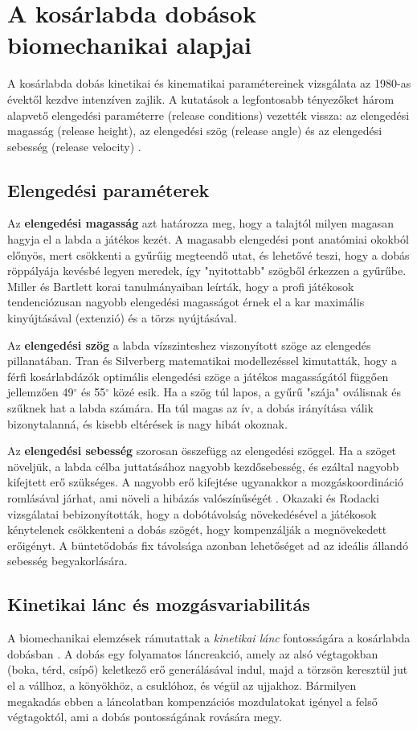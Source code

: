 \section{A kosárlabda dobások biomechanikai alapjai}
A kosárlabda dobás kinetikai és kinematikai paramétereinek vizsgálata az 1980-as évektől kezdve intenzíven zajlik. A kutatások a legfontosabb tényezőket három alapvető elengedési paraméterre (release conditions) vezették vissza: az elengedési magasság (release height), az elengedési szög (release angle) és az elengedési sebesség (release velocity) \cite{Tran2008}.

\subsection{Elengedési paraméterek}
Az \textbf{elengedési magasság} azt határozza meg, hogy a talajtól milyen magasan hagyja el a labda a játékos kezét. A magasabb elengedési pont anatómiai okokból előnyös, mert csökkenti a gyűrűig megteendő utat, és lehetővé teszi, hogy a dobás röppályája kevésbé legyen meredek, így "nyitottabb" szögből érkezzen a gyűrűbe. Miller és Bartlett \cite{Miller1996} korai tanulmányaiban leírták, hogy a profi játékosok tendenciózusan nagyobb elengedési magasságot érnek el a kar maximális kinyújtásával (extenzió) és a törzs nyújtásával.

Az \textbf{elengedési szög} a labda vízszinteshez viszonyított szöge az elengedés pillanatában. Tran és Silverberg \cite{Tran2008} matematikai modellezéssel kimutatták, hogy a férfi kosárlabdázók optimális elengedési szöge a játékos magasságától függően jellemzően 49$^\circ$ és 55$^\circ$ közé esik. Ha a szög túl lapos, a gyűrű "szája" oválisnak és szűknek hat a labda számára. Ha túl magas az ív, a dobás irányítása válik bizonytalanná, és kisebb eltérések is nagy hibát okoznak.

Az \textbf{elengedési sebesség} szorosan összefügg az elengedési szöggel. Ha a szöget növeljük, a labda célba juttatásához nagyobb kezdősebesség, és ezáltal nagyobb kifejtett erő szükséges. A nagyobb erő kifejtése ugyanakkor a mozgáskoordináció romlásával járhat, ami növeli a hibázás valószínűségét \cite{Okazaki2012}. Okazaki és Rodacki \cite{Okazaki2012} vizsgálatai bebizonyították, hogy a dobótávolság növekedésével a játékosok kénytelenek csökkenteni a dobás szögét, hogy kompenzálják a megnövekedett erőigényt. A büntetődobás fix távolsága azonban lehetőséget ad az ideális állandó sebesség begyakorlására.

\subsection{Kinetikai lánc és mozgásvariabilitás}
A biomechanikai elemzések rámutattak a \textit{kinetikai lánc} fontosságára a kosárlabda dobásban \cite{Elliott1992}. A dobás egy folyamatos láncreakció, amely az alsó végtagokban (boka, térd, csípő) keletkező erő generálásával indul, majd a törzsön keresztül jut el a vállhoz, a könyökhöz, a csuklóhoz, és végül az ujjakhoz. Bármilyen megakadás ebben a láncolatban kompenzációs mozdulatokat igényel a felső végtagoktól, ami a dobás pontosságának rovására megy.

